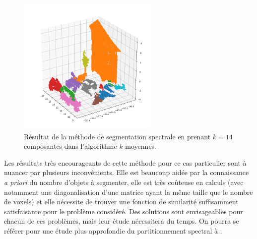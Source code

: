\documentclass[a4paper, onecolumn, 11pt]{article}
\begin{document}
\begin{figure}[h]
    \centering
    \includegraphics[width=0.6\textwidth]{fig/third_segmentation_spectral.png}
    \caption{Résultat de la méthode de segmentation spectrale en prenant $k = 14$ composantes dans l'algorithme $k$-moyennes.}
    \label{fig:resultat-segmentation-spectrale}
\end{figure}

Les résultats très encourageants de cette méthode pour ce cas particulier sont à nuancer par plusieurs inconvénients. Elle est beaucoup aidée par la connaissance \emph{a priori} du nombre d'objets à segmenter, elle est très coûteuse en calculs (avec notamment une diagonalisation d'une matrice ayant la même taille que le nombre de voxels) et elle nécessite de trouver une fonction de similarité suffisamment satisfaisante pour le problème considéré. Des solutions sont envisageables pour chacun de ces problèmes, mais leur étude nécessitera du temps. On pourra se référer pour une étude plus approfondie du partitionnement spectral à \cite{spectralclustering}.
\end{document}
